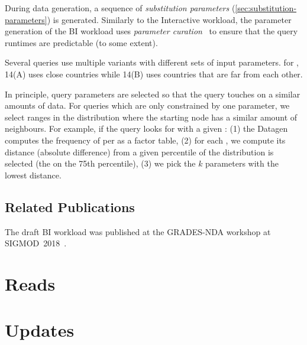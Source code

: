 During data generation, a sequence of \emph{substitution parameters} (\autoref{sec:substitution-parameters}) is generated.
Similarly to the Interactive workload, the parameter generation of the BI workload uses \emph{parameter curation}~\cite{DBLP:conf/tpctc/GubichevB14} to ensure that the query runtimes are  predictable (to some extent).

Several queries use multiple variants with different sets of input parameters.
\Eg for , 14(A) uses close countries while 14(B) uses countries that are far from each other.

In principle, query parameters are selected so that the query touches on a similar amounts of data.
For queries which are only constrained by one parameter, we select ranges in the distribution where the starting node has a similar amount of neighbours.
For example, if the query looks for \tMessages with a given \tTag:
(1) the Datagen computes the frequency of \tMessages per \tTags as a factor table,
(2) for each \tTag, we compute its distance (absolute difference) from a given percentile of the distribution is selected (\eg the \tTag on the 75th percentile),
(3) we pick the $k$ parameters with the lowest distance.

\subsection*{Related Publications}

The draft BI workload was published at the \mbox{GRADES-NDA} workshop at \mbox{SIGMOD 2018}~\cite{DBLP:conf/grades/SzarnyasPAMPKEB18}.


\section{Reads}
\label{sec:bi-reads}




\section{Updates}
\label{sec:bi-updates}

